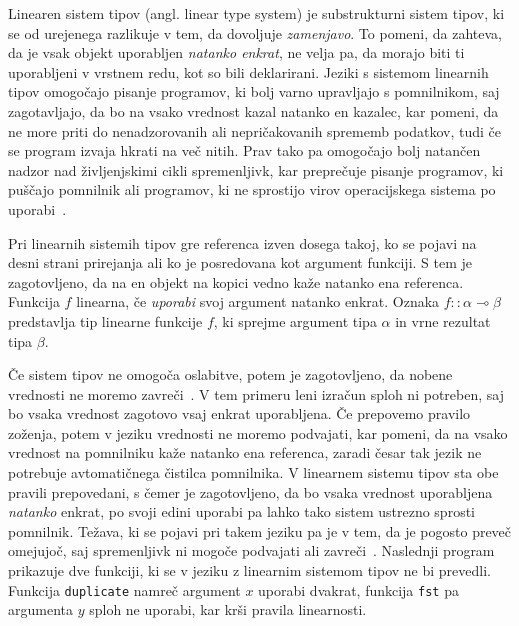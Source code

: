 Linearen sistem tipov (angl. linear type system) je substrukturni sistem tipov, ki se od urejenega razlikuje v tem, da dovoljuje \textit{zamenjavo}. To pomeni, da zahteva, da je vsak objekt uporabljen \textit{natanko enkrat}, ne velja pa, da morajo biti ti uporabljeni v vrstnem redu, kot so bili deklarirani. Jeziki s sistemom linearnih tipov omogočajo pisanje programov, ki bolj varno upravljajo s pomnilnikom, saj zagotavljajo, da bo na vsako vrednost kazal natanko en kazalec, kar pomeni, da ne more priti do nenadzorovanih ali nepričakovanih sprememb podatkov, tudi če se program izvaja hkrati na več nitih. Prav tako pa omogočajo bolj natančen nadzor nad življenjskimi cikli spremenljivk, kar preprečuje pisanje programov, ki puščajo pomnilnik ali programov, ki ne sprostijo virov operacijskega sistema po uporabi~\cite{pierce2004advanced}.


Pri linearnih sistemih tipov gre referenca izven dosega takoj, ko se pojavi na desni strani prirejanja ali ko je posredovana kot argument funkciji. S tem je zagotovljeno, da na en objekt na kopici vedno kaže natanko ena referenca. Funkcija $f$ linearna, če \textit{uporabi} svoj argument natanko enkrat. Oznaka $f :: \alpha \multimap \beta$ predstavlja tip linearne funkcije $f$, ki sprejme argument tipa $\alpha$ in vrne rezultat tipa $\beta$.


Če sistem tipov ne omogoča oslabitve, potem je zagotovljeno, da nobene vrednosti ne moremo zavreči~\cite{wadler1991there}. V tem primeru leni izračun sploh ni potreben, saj bo vsaka vrednost zagotovo vsaj enkrat uporabljena. Če prepovemo pravilo zoženja, potem v jeziku vrednosti ne moremo podvajati, kar pomeni, da na vsako vrednost na pomnilniku kaže natanko ena referenca, zaradi česar tak jezik ne potrebuje avtomatičnega čistilca pomnilnika. V linearnem sistemu tipov sta obe pravili prepovedani, s čemer je zagotovljeno, da bo vsaka vrednost uporabljena \textit{natanko} enkrat, po svoji edini uporabi pa lahko tako sistem ustrezno sprosti pomnilnik. Težava, ki se pojavi pri takem jeziku pa je v tem, da je pogosto preveč omejujoč, saj spremenljivk ni mogoče podvajati ali zavreči~\cite{wadler1990linear}. Naslednji program prikazuje dve funkciji, ki se v jeziku z linearnim sistemom tipov ne bi prevedli. Funkcija \texttt{duplicate} namreč argument $x$ uporabi dvakrat, funkcija \texttt{fst} pa argumenta $y$ sploh ne uporabi, kar krši pravila linearnosti.

